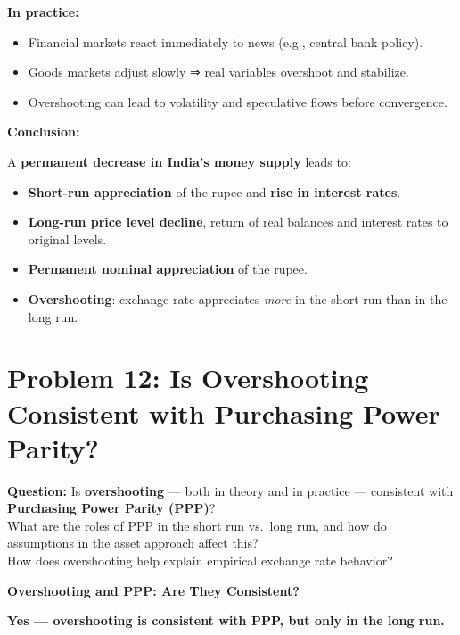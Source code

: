 \documentclass[
]{article}
\providecommand{\tightlist}{%
  \setlength{\itemsep}{0pt}\setlength{\parskip}{0pt}}
\begin{document}
\textbf{In practice:}

\begin{itemize}
\tightlist
\item
  Financial markets react immediately to news (e.g., central bank
  policy).
\item
  Goods markets adjust slowly ⇒ real variables overshoot and stabilize.
\item
  Overshooting can lead to volatility and speculative flows before
  convergence.
\end{itemize}

\textbf{Conclusion:}

A \textbf{permanent decrease in India's money supply} leads to:

\begin{itemize}
\tightlist
\item
  \textbf{Short-run appreciation} of the rupee and \textbf{rise in
  interest rates}.
\item
  \textbf{Long-run price level decline}, return of real balances and
  interest rates to original levels.
\item
  \textbf{Permanent nominal appreciation} of the rupee.
\item
  \textbf{Overshooting}: exchange rate appreciates \emph{more} in the
  short run than in the long run.
\end{itemize}

\section{Problem 12: Is Overshooting Consistent with Purchasing Power
Parity?}\label{problem-12-is-overshooting-consistent-with-purchasing-power-parity}

\textbf{Question:} Is \textbf{overshooting} --- both in theory and in
practice --- consistent with \textbf{Purchasing Power Parity (PPP)}?\\
What are the roles of PPP in the short run vs.~long run, and how do
assumptions in the asset approach affect this?\\
How does overshooting help explain empirical exchange rate behavior?

\textbf{Overshooting and PPP: Are They Consistent?}

\textbf{Yes --- overshooting is consistent with PPP, but only in the
long run.}
\end{document}
